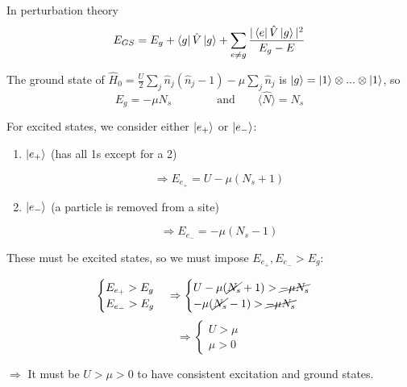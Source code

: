 In perturbation theory
$$E_{GS} = E_g + \bra{g}\hat{V}\ket{g} + \sum_{e\neq g}\frac{|\bra{e}\hat{V}\ket{g}|^2}{E_g-E}$$

\noindent The ground state of $\hat{H}_0 = \frac{U}{2}\sum_j \hat{n}_j(\hat{n}_j-1) - \mu \sum_j\hat{n}_j$ is $\ket{g}=\ket{1}\otimes...\otimes\ket{1}$, so
    \begin{equation*}
        E_g = -\mu N_s  \qquad\qquad \text{and} \qquad \langle \hat{N} \rangle = N_s
    \end{equation*}

\noindent For excited states, we consider either $\ket{e_+}$ or $\ket{e_-}$:
\begin{enumerate}
    \item $\ket{e_+}$ (has all 1s except for a 2)
    \begin{center}
        \scalebox{1.2}{
            
        }
    \end{center}
    $$\Rightarrow E_{e_+} = U - \mu(N_s+1)$$
    \item $\ket{e_-}$ (a particle is removed from a site)
    \begin{center}
        \scalebox{1.2}{  }
    \end{center}
    $$\Rightarrow E_{e_-} = - \mu(N_s-1)$$
\end{enumerate}

\begin{tcolorbox}
These must be excited states, so we must impose $E_{e_+}, E_{e_-} > E_{g}$:

\begin{equation*}
    \begin{cases}
        E_{e_+} > E_g\\
        E_{e_-} > E_g
    \end{cases}
    \Rightarrow
    \begin{cases}
        U - \mu (\cancel{N_s}+1) > \cancel{-\mu N_s}\\
        - \mu (\cancel{N_s}-1) > \cancel{-\mu N_s}
    \end{cases}
\end{equation*}
\begin{equation*}
    \Rightarrow \begin{cases}
        U > \mu\\
        \mu > 0
    \end{cases}
\end{equation*}

$\Rightarrow$ It must be $U > \mu > 0$ to have consistent excitation and ground states.
\end{tcolorbox}


